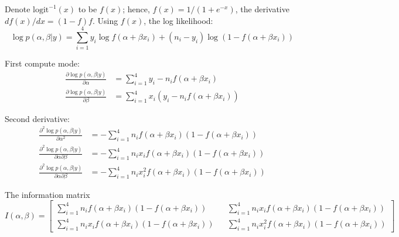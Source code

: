 \documentclass{article}
\begin{document}
\begin{itemize}
Denote $\text{logit}^{-1}(x)$ to be $f(x)$; hence, $f(x) = 1/\left(1 + e^{-x}\right)$, the derivative $df(x)/dx = (1 - f) f$. Using $f(x)$, the log likelihood:
$$
\log p(\alpha, \beta | y) = \sum_{i=1}^4 y_i \log f(\alpha + \beta x_i) + (n_i - y_i) \log \left (1 - f(\alpha + \beta x_i) \right)
$$

First compute mode:
\begin{align*}
  \frac{\partial \log p(\alpha, \beta | y)}{\partial \alpha} &= \sum_{i=1}^4 y_i - n_i f(\alpha + \beta x_i) \\
  \frac{\partial \log p(\alpha, \beta | y)}{\partial \beta} &= \sum_{i=1}^4 x_i(y_i - n_i f(\alpha + \beta x_i))
\end{align*}

Second derivative:
\begin{align}
  \frac{\partial^2 \log p(\alpha, \beta | y)}{\partial \alpha^2} &= -\sum_{i=1}^4 n_i f(\alpha + \beta x_i) \left ( 1 - f(\alpha + \beta x_i) \right ) \\
  \frac{\partial^2 \log p(\alpha, \beta | y)}{\partial \alpha \partial \beta} &= - \sum_{i=1}^4 n_i x_i f(\alpha + \beta x_i) ( 1 - f(\alpha + \beta x_i)) \\
  \frac{\partial^2 \log p(\alpha, \beta | y)}{\partial \alpha \partial \beta} &= - \sum_{i=1}^4 n_i x_i^2 f(\alpha + \beta x_i) (1 - f(\alpha + \beta x_i))
\end{align}

The information matrix
$$
I(\alpha, \beta) = \begin{bmatrix} \sum_{i=1}^4 n_i f(\alpha + \beta x_i) \left ( 1 - f(\alpha + \beta x_i) \right) && \sum_{i=1}^4 n_i x_i f(\alpha + \beta x_i) ( 1 - f(\alpha + \beta x_i)) \\ 
\sum_{i=1}^4 n_i x_i f(\alpha + \beta x_i) ( 1 - f(\alpha + \beta x_i)) &&  \sum_{i=1}^4 n_i x_i^2 f(\alpha + \beta x_i) (1 - f(\alpha + \beta x_i)) \end{bmatrix}
$$

\end{itemize}
\end{document}
